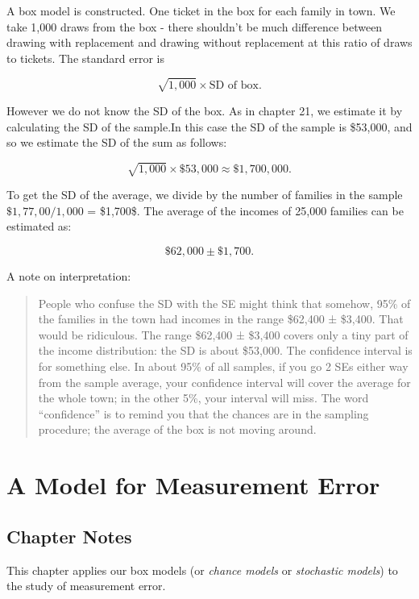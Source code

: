 \documentclass[
]{book}
\begin{document}
A box model is constructed. One ticket in the box for each family in town. We take 1,000 draws from the box - there shouldn't be much difference between drawing with replacement and drawing without replacement at this ratio of draws to tickets. The standard error is

\[
\sqrt{1,000} \times \text{SD of box}.
\]

However we do not know the SD of the box. As in chapter 21, we estimate it by calculating the SD of the sample.In this case the SD of the sample is \$53,000, and so we estimate the SD of the sum as follows:

\[
\sqrt{1,000} \times \$53,000 \approx \$1,700,000.
\]

To get the SD of the average, we divide by the number of families in the sample \(\$1,77,00 / 1,000\) = \$1,700\$. The average of the incomes of 25,000 families can be estimated as:

\[
\$62,000 \pm \$1,700.
\]

A note on interpretation:

\begin{quote}
People who confuse the SD with the SE might think that somehow, 95\% of the families in the town had incomes in the range \$62,400 ± \$3,400. That would be ridiculous. The range \$62,400 ± \$3,400 covers only a tiny part of the income distribution: the SD is about \$53,000. The confidence interval is for something else. In about 95\% of all samples, if you go 2 SEs either way from the sample average, your confidence interval will cover the average for the whole town; in the other 5\%, your interval will miss. The word ``confidence'' is to remind you that the chances are in the sampling procedure; the average of the box is not moving around.
\end{quote}

\hypertarget{model_measurement}{%
\chapter{A Model for Measurement Error}\label{model_measurement}}

\hypertarget{chapter-notes-23}{%
\section{Chapter Notes}\label{chapter-notes-23}}

This chapter applies our box models (or \emph{chance models} or \emph{stochastic models}) to the study of measurement error.
\end{document}
